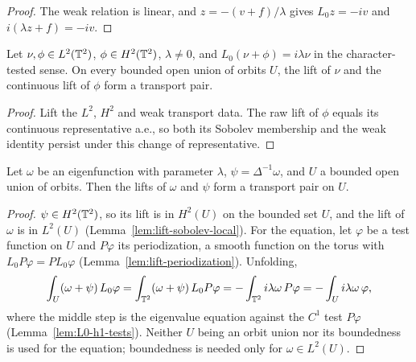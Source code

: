 \begin{proof}
\leanok
The weak relation is linear, and $z=-(v+f)/\lambda$ gives
$L_0z=-i v$ and $i(\lambda z+f)=-iv$.
\end{proof}

\begin{lemma}
\label{lem:periodic-transport-pair}
\leanok
Let $\nu,\phi\in L^2(\mathbb{T}^2)$, $\phi\in H^2(\mathbb{T}^2)$, $\lambda\ne0$, and
$L_0(\nu+\phi)=i\lambda\nu$ in the character-tested sense.
On every bounded open union of orbits $U$, the lift of $\nu$ and the
continuous lift of $\phi$ form a transport pair.
\end{lemma}

\begin{proof}
\leanok
Lift the $L^2$, $H^2$ and weak transport data. The raw lift of $\phi$
equals its continuous representative a.e., so both its Sobolev membership
and the weak identity persist under this change of representative.
\end{proof}

\begin{lemma}
\label{lem:transport-pair-eigen}
\leanok
Let $\omega$ be an eigenfunction with parameter $\lambda$, $\psi=\Delta^{-1}\omega$,
and $U$ a bounded open union of orbits. Then the lifts of $\omega$ and $\psi$ form a
transport pair on $U$.
\end{lemma}

\begin{proof}
\leanok
$\psi\in H^2(\mathbb{T}^2)$, so its lift is in $H^2(U)$ on the bounded set $U$,
and the lift of $\omega$ is in $L^2(U)$ (Lemma~\ref{lem:lift-sobolev-local}).
For the equation, let $\varphi$ be a test function on $U$ and $P\varphi$ its periodization,
a smooth function on the torus with $L_0P\varphi=PL_0\varphi$
(Lemma~\ref{lem:lift-periodization}). Unfolding,
\[
 \int_U(\omega+\psi)\,L_0\varphi=\int_{\mathbb{T}^2}(\omega+\psi)\,L_0P\varphi
 =-\int_{\mathbb{T}^2}i\lambda\omega\,P\varphi=-\int_U i\lambda\omega\,\varphi,
\]
where the middle step is the eigenvalue equation against the $C^1$ test $P\varphi$
(Lemma~\ref{lem:L0-h1-tests}). Neither $U$ being an orbit union nor its boundedness is
used for the equation; boundedness is needed only for $\omega\in L^2(U)$.
\end{proof}

